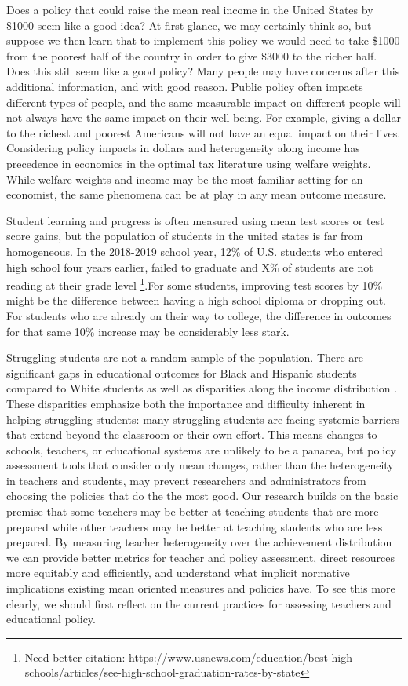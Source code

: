 \documentclass[letterpaper,12pt]{article}
\begin{document}
Does a policy that could raise the mean real income in the United States by \$1000 seem like a good idea? At first glance, we may certainly think so, but suppose we then learn that to implement this policy we would need to take \$1000 from the poorest half of the country in order to give \$3000 to the richer half. Does this still seem like a good policy? Many people may have concerns after this additional information, and with good reason. Public policy often impacts different types of people, and the same measurable impact on different people will not always have the same impact on their well-being. For example, giving a dollar to the richest and poorest Americans will not have an equal impact on their lives. Considering policy impacts in dollars and heterogeneity along income has precedence in economics in the optimal tax literature using welfare weights. While welfare weights and income may be the most familiar setting for an economist, the same phenomena can be at play in any mean outcome measure.

Student learning and progress is often measured using mean test scores or test score gains, but the population of students in the united states is far from homogeneous. In the 2018-2019 school year, 12\% of U.S. students who entered high school four years earlier, failed to graduate and X\% of students are not reading at their grade level \footnote{Need better citation: https://www.usnews.com/education/best-high-schools/articles/see-high-school-graduation-rates-by-state}.For some students, improving test scores by 10\% might be the difference between having a high school diploma or dropping out. For students who are already on their way to college, the difference in outcomes for that same 10\% increase may be considerably less stark. 

Struggling students are not a random sample of the population. There are significant gaps in educational outcomes for Black and Hispanic students compared to White students as well as disparities along the income distribution \citep{Reardon_2013, Reardon_2011}. These disparities emphasize both the importance and difficulty inherent in helping struggling students: many struggling students are facing systemic barriers that extend beyond the classroom or their own effort. This means changes to schools, teachers, or educational systems are unlikely to be a panacea, but policy assessment tools that consider only mean changes, rather than the heterogeneity in teachers and students, may prevent researchers and administrators from choosing the policies that do the the most good. Our research builds on the basic premise that some teachers may be better at teaching students that are more prepared while other teachers may be better at teaching students who are less prepared. By measuring teacher heterogeneity over the achievement distribution we can provide better metrics for teacher and policy assessment, direct resources more equitably and efficiently, and understand what implicit normative implications existing mean oriented measures and policies have. To see this more clearly, we should first reflect on the current practices for assessing teachers and educational policy.
	
\end{document}
